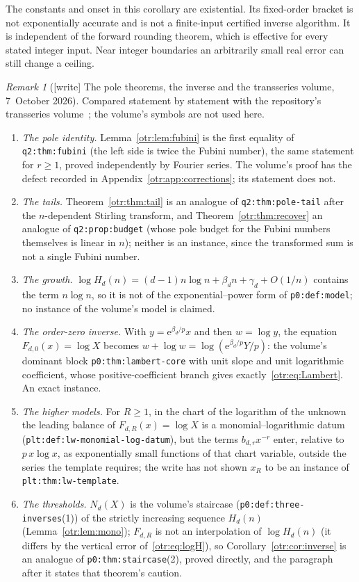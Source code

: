 \documentclass[11pt,a4paper]{article}
\theoremstyle{definition}\newtheorem{definition}[theorem]{Definition}
\theoremstyle{remark}\newtheorem{remark}[theorem]{Remark}
\newcommand{\e}{\mathrm e}
\newcommand{\file}[1]{\nolinkurl{#1}}
\begin{document}
The constants and onset in this corollary are existential. Its fixed-order bracket is not exponentially accurate and is not a finite-input certified inverse algorithm. It is independent of the forward rounding theorem, which is effective for every stated integer input. Near integer boundaries an arbitrarily small real error can still change a ceiling.

\begin{remark}[{[write]} The pole theorems, the inverse and the transseries volume, 7~October 2026]\label{otr:rem:transseries}
Compared statement by statement with the repository's transseries
volume~\cite{TSvol}; the volume's symbols are not used here.
\begin{enumerate}\raggedright
\item \emph{The pole identity.} Lemma~\ref{otr:lem:fubini} is the first
equality of \file{q2:thm:fubini} (the left side is twice the Fubini number),
the same statement for $r\ge1$, proved independently by Fourier series. The
volume's proof has the defect recorded in Appendix~\ref{otr:app:corrections};
its statement does not.
\item \emph{The tails.} Theorem~\ref{otr:thm:tail} is an analogue of
\file{q2:thm:pole-tail} after the $n$-dependent Stirling transform, and
Theorem~\ref{otr:thm:recover} an analogue of \file{q2:prop:budget} (whose pole
budget for the Fubini numbers themselves is linear in $n$); neither is an
instance, since the transformed sum is not a single Fubini number.
\item \emph{The growth.} $\log H_d(n)=(d-1)n\log n+\beta_dn+\gamma_d+O(1/n)$
contains the term $n\log n$, so it is not of the exponential--power form of
\file{p0:def:model}; no instance of the volume's model is claimed.
\item \emph{The order-zero inverse.} With $y=\e^{\beta_d/p}x$ and then
$w=\log y$, the equation $F_{d,0}(x)=\log X$ becomes
$w+\log w=\log(\e^{\beta_d/p}Y/p)$: the volume's dominant block
\file{p0:thm:lambert-core} with unit slope and unit logarithmic coefficient,
whose positive-coefficient branch gives exactly~\eqref{otr:eq:Lambert}. An
exact instance.
\item \emph{The higher models.} For $R\ge1$, in the chart of the logarithm of
the unknown the leading balance of $F_{d,R}(x)=\log X$ is a
monomial--logarithmic datum (\file{plt:def:lw-monomial-log-datum}), but the
terms $b_{d,r}x^{-r}$ enter, relative to $p\,x\log x$, as exponentially small
functions of that chart variable, outside the series the template requires;
the write has not shown $x_R$ to be an instance of \file{plt:thm:lw-template}.
\item \emph{The thresholds.} $N_d(X)$ is the volume's staircase
(\file{p0:def:three-inverses}(1)) of the strictly increasing sequence
$H_d(n)$ (Lemma~\ref{otr:lem:mono}); $F_{d,R}$ is not an interpolation of
$\log H_d(n)$ (it differs by the vertical error of~\eqref{otr:eq:logH}), so
Corollary~\ref{otr:cor:inverse} is an analogue of \file{p0:thm:staircase}(2),
proved directly, and the paragraph after it states that theorem's caution.
\end{enumerate}
\end{remark}
\end{document}
